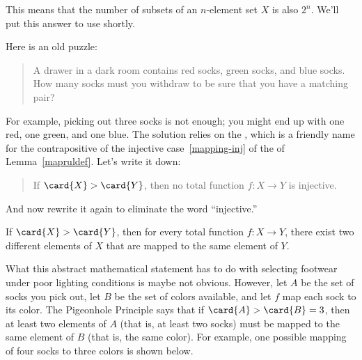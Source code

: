 This means that the number of subsets of an $n$-element set $X$ is
also $2^n$.  We'll put this answer to use shortly.


\begin{problems}
\practiceproblems
{}

\classproblems
{}

\homeworkproblems
{}
\end{problems}
\fi


Here is an old puzzle:

\begin{quotation}
\noindent A drawer in a dark room contains red socks, green socks, and
blue socks.  How many socks must you withdraw to be sure that you have
a matching pair?
\end{quotation}

For example, picking out three socks is not enough; you might end up with
one red, one green, and one blue.  The solution relies on the
, which is a friendly name for the
contrapositive of the injective case~\ref{mapping-inj} of the 
of Lemma~\ref{mapruldef}.  Let's write it down:

\begin{quotation}
If $\card{X} > \card{Y}$, then no total function $f : X \to Y$ is
injective.
\end{quotation}

And now rewrite it again to eliminate the word ``injective.''

\begin{mathrule}
  If $\card{X} > \card{Y}$, then for every total function $f : X \to Y$,
  there exist two different elements of $X$ that are mapped to the same
  element of $Y$.
\end{mathrule}

What this abstract mathematical statement has to do with selecting
footwear under poor lighting conditions is maybe not obvious.  However,
let $A$ be the set of socks you pick out, let $B$ be the set of colors
available, and let $f$ map each sock to its color.  The Pigeonhole
Principle says that if $\card{A} > \card{B} = 3$, then at least two
elements of $A$ (that is, at least two socks) must be mapped to the same
element of $B$ (that is, the same color).  For example, one possible
mapping of four socks to three colors is shown below.

